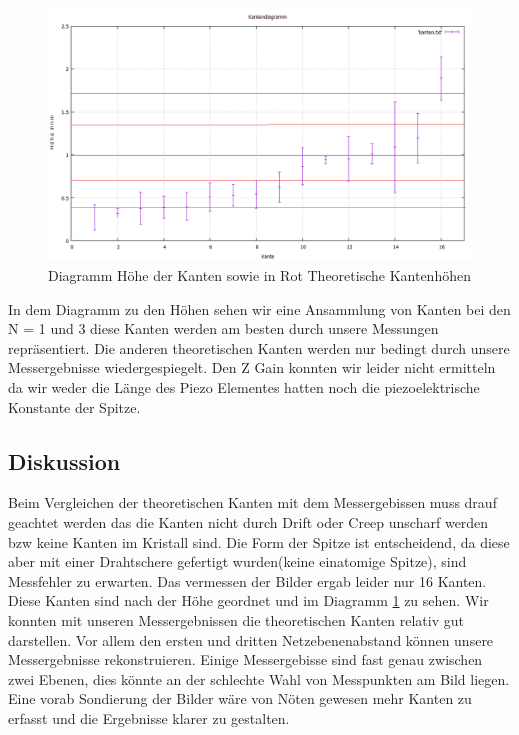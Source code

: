 \documentclass[10pt,a4paper]{article}
\begin{document}
\begin{figure}[]
	\includegraphics[scale = 0.5]{kantendia.png}
	\centering
	\caption{Diagramm Höhe der Kanten sowie in Rot Theoretische Kantenhöhen}
	\label{kantendia}
\end{figure}

In dem Diagramm zu den Höhen sehen wir eine Ansammlung von Kanten bei den N = 1 und 3 diese Kanten werden am besten durch unsere Messungen repräsentiert. Die anderen theoretischen Kanten werden nur bedingt durch unsere Messergebnisse wiedergespiegelt.
Den Z Gain konnten wir leider nicht ermitteln da wir weder die Länge des Piezo Elementes hatten noch die  piezoelektrische Konstante der Spitze.



\subsection{ Diskussion}

Beim Vergleichen der theoretischen Kanten mit dem Messergebissen muss drauf geachtet werden das die Kanten nicht durch Drift oder Creep unscharf werden bzw keine Kanten im Kristall sind. Die Form der Spitze ist entscheidend, da diese aber mit einer Drahtschere gefertigt wurden(keine einatomige Spitze), sind Messfehler zu erwarten. 
Das vermessen der Bilder ergab leider nur 16 Kanten. Diese Kanten sind nach der Höhe geordnet und im Diagramm \ref{kantendia} zu sehen. Wir konnten mit unseren Messergebnissen die theoretischen Kanten relativ gut darstellen. Vor allem den ersten und dritten Netzebenenabstand können unsere Messergebnisse rekonstruieren. Einige Messergebisse sind fast genau zwischen zwei Ebenen, dies könnte an der schlechte Wahl von Messpunkten am Bild liegen. Eine vorab Sondierung der Bilder wäre von Nöten gewesen mehr Kanten zu erfasst und die Ergebnisse klarer zu gestalten.
\end{document}
